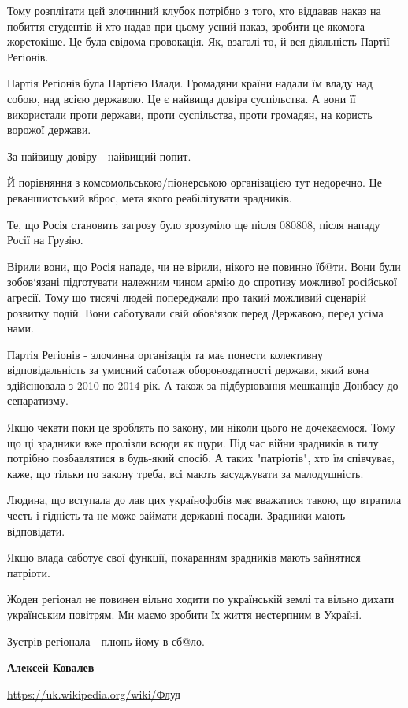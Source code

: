 \begin{itemize}
Тому розплітати цей злочинний клубок потрібно з того, хто віддавав наказ на
побиття студентів й хто надав при цьому усний наказ, зробити це якомога
жорстокіше. Це була свідома провокація. Як, взагалі-то, й вся діяльність Партії
Регіонів.

Партія Регіонів була Партією Влади. Громадяни країни надали їм владу над собою,
над всією державою. Це є найвища довіра суспільства. А вони її використали
проти держави, проти суспільства, проти громадян, на користь ворожої держави.

За найвищу довіру - найвищий попит.

Й порівняння з комсомольською/піонерською організацією тут недоречно. Це
реваншистський вброс, мета якого реабілітувати зрадників.

Те, що Росія становить загрозу було зрозуміло ще після 080808, після нападу
Росії на Грузію.

Вірили вони, що Росія нападе, чи не вірили, нікого не повинно їб@ти. Вони були
зобов`язані підготувати належним чином армію до спротиву можливої російської
агресії. Тому що тисячі людей попереджали про такий можливий сценарій розвитку
подій. Вони саботували свій обов`язок перед Державою, перед усіма нами.

Партія Регіонів - злочинна організація та має понести колективну
відповідальність за умисний саботаж обороноздатності держави, який вона
здійснювала з 2010 по 2014 рік. А також за підбурювання мешканців Донбасу до
сепаратизму.

Якщо чекати поки це зроблять по закону, ми ніколи цього не дочекаємося. Тому що
ці зрадники вже пролізли всюди як щури. Під час війни зрадників в тилу потрібно
позбавлятися в будь-який спосіб. А таких "патріотів", хто їм співчуває, каже,
що тільки по закону треба, всі мають засуджувати за малодушність.

Людина, що вступала до лав цих українофобів має вважатися такою, що втратила
честь і гідність та не може займати державні посади. Зрадники мають
відповідати.

Якщо влада саботує свої функції, покаранням зрадників мають зайнятися патріоти.

Жоден регіонал не повинен вільно ходити по українській землі та вільно дихати
українським повітрям. Ми маємо зробити їх життя нестерпним в Україні.

Зустрів регіонала - плюнь йому в єб@ло.  

\textbf{Алексей Ковалев}

\url{https://uk.wikipedia.org/wiki/Флуд}

\end{itemize} %
